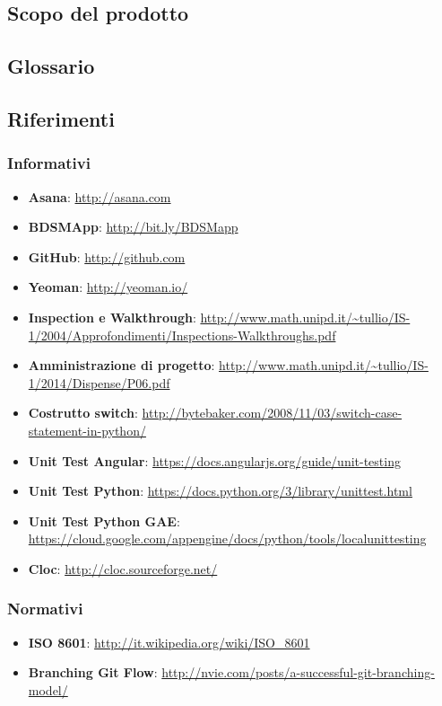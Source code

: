 	\subsection{Scopo del prodotto}
		\productScope

	\subsection{Glossario}
		\glossarioDesc

	\subsection{Riferimenti}
		\subsubsection{Informativi}
		\begin{itemize}
			\item \textbf{Asana}: \url{http://asana.com}
			\item \textbf{BDSMApp}: \url{http://bit.ly/BDSMapp}
			\item \textbf{GitHub}: \url{http://github.com}
			\item \textbf{Yeoman}: \url{http://yeoman.io/}
			\item \textbf{Inspection e Walkthrough}: \url{http://www.math.unipd.it/~tullio/IS-1/2004/Approfondimenti/Inspections-Walkthroughs.pdf}
			\item \textbf{Amministrazione di progetto}: \url{http://www.math.unipd.it/~tullio/IS-1/2014/Dispense/P06.pdf}
			\item \textbf{Costrutto switch}: \url{http://bytebaker.com/2008/11/03/switch-case-statement-in-python/}
			\item \textbf{Unit Test Angular}: \url{https://docs.angularjs.org/guide/unit-testing}
			\item \textbf{Unit Test Python}: \url{https://docs.python.org/3/library/unittest.html}
			\item \textbf{Unit Test Python GAE}: \url{https://cloud.google.com/appengine/docs/python/tools/localunittesting}
			\item \textbf{Cloc}: \url{http://cloc.sourceforge.net/}
		\end{itemize}

		\subsubsection{Normativi}
		\begin{itemize}
			\item \textbf{ISO 8601}: \url{http://it.wikipedia.org/wiki/ISO_8601}
			\item \textbf{Branching Git Flow}: \url{http://nvie.com/posts/a-successful-git-branching-model/}
		\end{itemize}
